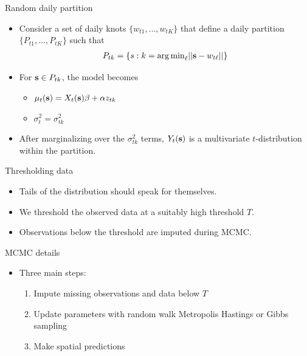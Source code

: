 \documentclass{beamer}
\begin{document}
\begin{frame}{Random daily partition}
  \begin{itemize} \setlength{\itemsep}{0.5em}
    \item Consider a set of daily knots $\{w_{t1}, \ldots, w_{tK}\}$ that define a daily partition
    $\{P_{t1}, \ldots, P_{tK}\}$ such that
    \begin{align*}
      P_{tk} = \{s : k = {\mathop{\rm arg\, min}}_\ell|| \mbox{\bf s} - w_{t\ell}|| \}
    \end{align*}
    \item For $\mbox{\bf s} \in P_{tk}$, the model becomes
    \begin{itemize}
      \item $\mu_t(\mbox{\bf s}) = X_t(\mbox{\bf s}) \beta + \alpha z_{tk}$
      \item $\sigma^2_t = \sigma^2_{tk}$
    \end{itemize}
    \item After marginalizing over the $\sigma_{tk}^2$ terms, $Y_t(\mbox{\bf s})$ is a multivariate $t$-distribution
    within the partition.
  \end{itemize}
\end{frame}

\begin{frame}{Thresholding data}
  \begin{itemize} \setlength{\itemsep}{0.5em}
    \item Tails of the distribution should speak for themselves.
    \item We threshold the observed data at a suitably high threshold $T$.
    \item Observations below the threshold are imputed during MCMC.
  \end{itemize}
\end{frame}

\begin{frame}{MCMC details}
  \begin{itemize} \setlength{\itemsep}{0.5em}
    \item Three main steps:
    \begin{enumerate}[1.]
      \item Impute missing observations and data below $T$
      \item Update parameters with random walk Metropolis Hastings or Gibbs sampling
      \item Make spatial predictions
    \end{enumerate}
  \end{itemize}
\end{frame}
\end{document}
